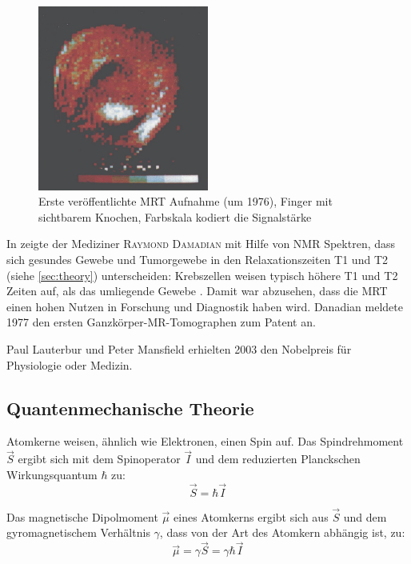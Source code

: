\begin{figure}[H]
	\centering
	\includegraphics[width=0.5\textwidth]{img/ext/mansfieldFinger.png}
	\caption[Erste MRT Aufnahme von Mansfield]{Erste veröffentlichte MRT Aufnahme (um 1976), Finger mit sichtbarem Knochen, Farbskala kodiert die Signalstärke \cite{Mansfield1977a}}
	\label{fig:mansfieldFinger}
\end{figure}

In \cite{Damadian1971} zeigte der Mediziner \textsc{Raymond Damadian} mit Hilfe von NMR Spektren, dass sich gesundes Gewebe und Tumorgewebe in den Relaxationszeiten T1 und T2 (siehe \autoref{sec:theory}) unterscheiden: Krebszellen weisen typisch höhere T1 und T2 Zeiten auf, als das umliegende Gewebe \cite{Damadian1971}. Damit war abzusehen, dass die MRT einen hohen Nutzen in Forschung und Diagnostik haben wird. Danadian meldete 1977 den ersten Ganzkörper-MR-Tomographen zum Patent an.

Paul Lauterbur und Peter Mansfield erhielten 2003 den Nobelpreis für Physiologie oder Medizin.


\subsection{Quantenmechanische Theorie}
\label{sec:theory}
\label{sec:nmrTheory}
Atomkerne weisen, ähnlich wie Elektronen, einen Spin auf. Das Spindrehmoment $\vec{S}$ ergibt sich mit dem Spinoperator $\vec{I}$ und dem reduzierten Planckschen Wirkungsquantum $\hbar$ zu:
\begin{equation}
	\vec{S}=\hbar \vec{I}
\end{equation}

Das magnetische Dipolmoment $\vec{\mu}$ eines Atomkerns ergibt sich aus $\vec{S}$ und dem gyromagnetischem Verhältnis $\gamma$, dass von der Art des Atomkern abhängig ist, zu:
\begin{equation}
	\vec{\mu}=\gamma \vec{S} = \gamma \hbar \vec{I}
\end{equation}

